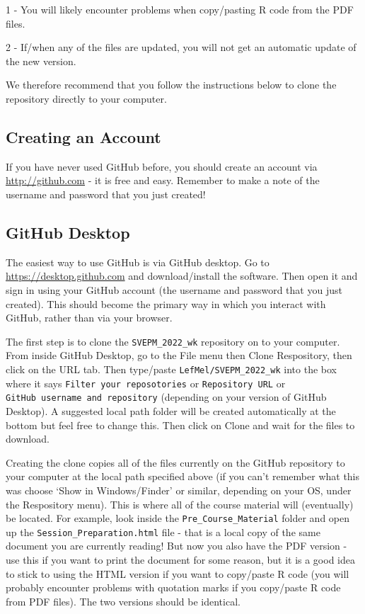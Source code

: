 \documentclass[
  12pt,
]{article}
\begin{document}
1 - You will likely encounter problems when copy/pasting R code from the
PDF files.

2 - If/when any of the files are updated, you will not get an automatic
update of the new version.

We therefore recommend that you follow the instructions below to clone
the repository directly to your computer.

\hypertarget{creating-an-account}{%
\subsection{Creating an Account}\label{creating-an-account}}

If you have never used GitHub before, you should create an account via
\url{http://github.com} - it is free and easy. Remember to make a note
of the username and password that you just created!

\hypertarget{github-desktop}{%
\subsection{GitHub Desktop}\label{github-desktop}}

The easiest way to use GitHub is via GitHub desktop. Go to
\url{https://desktop.github.com} and download/install the software. Then
open it and sign in using your GitHub account (the username and password
that you just created). This should become the primary way in which you
interact with GitHub, rather than via your browser.

The first step is to clone the \texttt{SVEPM\_2022\_wk} repository on to
your computer. From inside GitHub Desktop, go to the File menu then
Clone Respository, then click on the URL tab. Then type/paste
\texttt{LefMel/SVEPM\_2022\_wk} into the box where it says
\texttt{Filter\ your\ reposotories} or \texttt{Repository\ URL} or
\texttt{GitHub\ username\ and\ repository} (depending on your version of
GitHub Desktop). A suggested local path folder will be created
automatically at the bottom but feel free to change this. Then click on
Clone and wait for the files to download.

Creating the clone copies all of the files currently on the GitHub
repository to your computer at the local path specified above (if you
can't remember what this was choose `Show in Windows/Finder' or similar,
depending on your OS, under the Respository menu). This is where all of
the course material will (eventually) be located. For example, look
inside the
\texttt{\textquotesingle{}Pre\_Course\_Material\textquotesingle{}}
folder and open up the
\texttt{\textquotesingle{}Session\_Preparation.html\textquotesingle{}}
file - that is a local copy of the same document you are currently
reading! But now you also have the PDF version - use this if you want to
print the document for some reason, but it is a good idea to stick to
using the HTML version if you want to copy/paste R code (you will
probably encounter problems with quotation marks if you copy/paste R
code from PDF files). The two versions should be identical.
\end{document}

